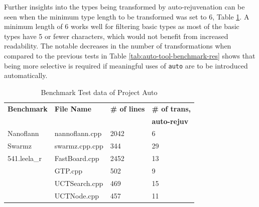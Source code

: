 \documentclass[bsc,frontabs,singlespacing,twoside,parskip,deptreport]{infthesis}
\begin{document}
Further insights into the types being transformed by auto-rejuvenation can be seen when the minimum type length to be transformed was set to 6, Table \ref{tab:auto-tool-benchmark-type-limit}. A minimum length of 6 works well for filtering basic types as most of the basic types have 5 or fewer characters, which would not benefit from increased readability. The notable decreases in the number of transformations when compared to the previous tests in Table \ref{tab:auto-tool-benchmark-res} shows that being more selective is required if meaningful uses of \texttt{auto} are to be introduced automatically.




\begin{table}[H]
    \begin{center}
        \begin{tabular}{| l | l | l | l |}
            \hline
            \textbf{Benchmark}    & \textbf{File Name}    & \textbf{\# of lines}  & \textbf{\# of trans,} \\
                                  &                       &                       & \textbf{auto-rejuv}   \\ \hline
            Nanoflann    & nannoflann.cpp   & 2042  & 6  \\ \hline
            Swarmz       & swarmz.cpp.cpp   & 344   & 29 \\ \hline
            541.leela\_r & FastBoard.cpp    & 2452	& 13 \\ \hline
                         & GTP.cpp          & 502	& 9  \\ \hline
                         & UCTSearch.cpp    & 469   & 15 \\ \hline
                         & UCTNode.cpp	    & 457   & 11 \\ \hline
        \end{tabular}
        \caption{Benchmark Test data of Project Auto }
        \label{tab:auto-tool-benchmark-type-limit}
    \end{center}
\end{table}
\end{document}
